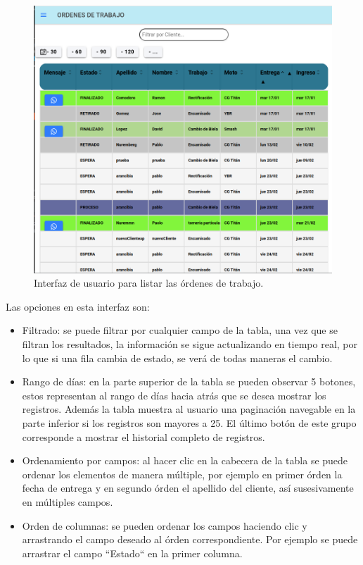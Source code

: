 \begin{figure}[H]
	\centering
	\includegraphics[scale=.30]{./Figures/listado-1.png}
	\caption{Interfaz de usuario para listar las órdenes de trabajo.}
	\label{fig:listado1}
\end{figure}

Las opciones en esta interfaz son:

\begin{itemize}
\item Filtrado: se puede filtrar por cualquier campo de la tabla, una vez que se filtran los resultados, la información se sigue actualizando en tiempo real, por lo que si una fila cambia de estado, se verá de todas maneras el cambio.

\item Rango de días: en la parte superior de la tabla se pueden observar 5 botones, estos representan al rango de días hacia atrás que se desea mostrar los registros. Además la tabla muestra al usuario una paginación navegable en la parte inferior si los registros son mayores a 25. El último botón de este grupo corresponde a mostrar el historial completo de registros.

\item Ordenamiento por campos: al hacer clic en la cabecera de la tabla se puede ordenar los elementos de manera múltiple, por ejemplo en primer órden la fecha de entrega y en segundo órden el apellido del cliente, así susesivamente en múltiples campos.

\item Orden de columnas: se pueden ordenar los campos haciendo clic y arrastrando el campo deseado al órden correspondiente. Por ejemplo se puede arrastrar el campo ``Estado`` en la primer columna.
\end{itemize}

